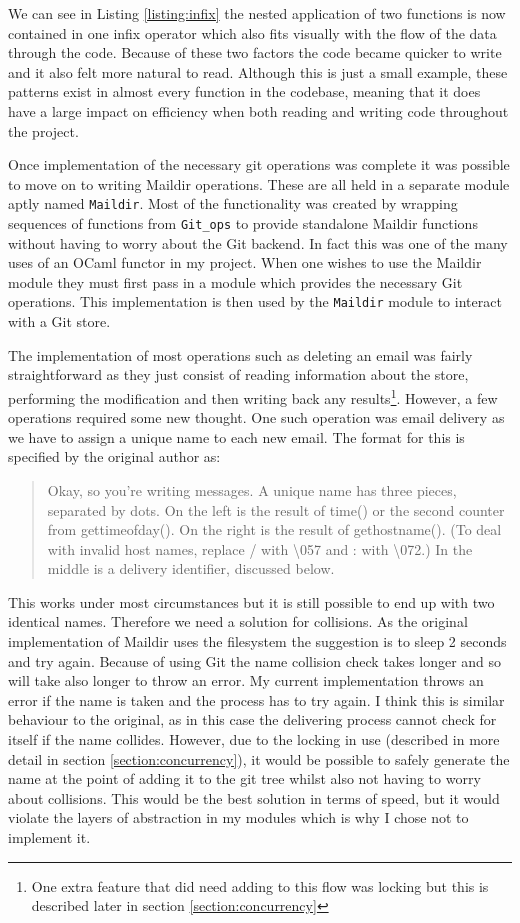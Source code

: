 We can see in Listing \ref{listing:infix} the nested application of two functions is now contained in one infix operator which also fits visually with the flow of the data through the code. Because of these two factors the code became quicker to write and it also felt more natural to read. Although this is just a small example, these patterns exist in almost every function in the codebase, meaning that it does have a large impact on efficiency when both reading and writing code throughout the project.

Once implementation of the necessary git operations was complete it was possible to move on to writing Maildir operations. These are all held in a separate module aptly named \texttt{Maildir}. Most of the functionality was created by wrapping sequences of functions from \texttt{Git\_ops} to provide standalone Maildir functions without having to worry about the Git backend. In fact this was one of the many uses of an OCaml functor in my project. When one wishes to use the Maildir module they must first pass in a module which provides the necessary Git operations. This implementation is then used by the \texttt{Maildir} module to interact with a Git store.

The implementation of most operations such as deleting an email was fairly straightforward as they just consist of reading information about the store, performing the modification and then writing back any results\footnote{One extra feature that did need adding to this flow was locking but this is described later in section \ref{section:concurrency}}. However, a few operations required some new thought. One such operation was email delivery as we have to assign a unique name to each new email. The format for this is specified by the original author\cite{bernstein2000maildir} as:
\begin{quote}
  Okay, so you're writing messages. A unique name has three pieces, separated by dots. On the left is the result of time() or the second counter from gettimeofday(). On the right is the result of gethostname(). (To deal with invalid host names, replace / with \textbackslash057 and : with \textbackslash072.) In the middle is a delivery identifier, discussed below.
\end{quote}
This works under most circumstances but it is still possible to end up with two identical names. Therefore we need a solution for collisions. As the original implementation of Maildir uses the filesystem the suggestion is to sleep 2 seconds and try again. Because of using Git the name collision check takes longer and so will take also longer to throw an error. My current implementation throws an error if the name is taken and the process has to try again. I think this is similar behaviour to the original, as in this case the delivering process cannot check for itself if the name collides. However, due to the locking in use (described in more detail in section \ref{section:concurrency}), it would be possible to safely generate the name at the point of adding it to the git tree whilst also not having to worry about collisions. This would be the best solution in terms of speed, but it would violate the layers of abstraction in my modules which is why I chose not to implement it.

